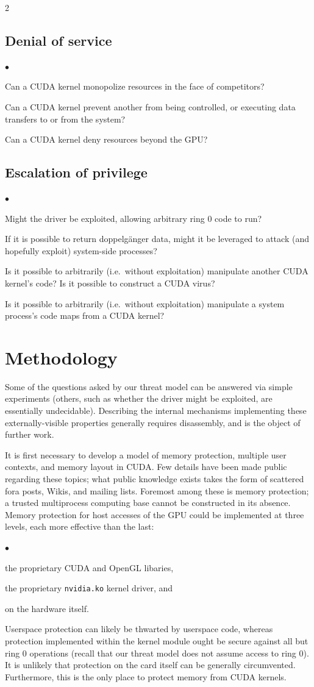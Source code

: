 \documentclass[letterpaper,10pt]{article}
\newcommand{\squishlist}{\begin{list}{$\bullet$}
  {\setlength{\itemsep}{0pt}
    \setlength{\parsep}{3pt}
    \setlength{\topsep}{3pt}
    \setlength{\partopsep}{0pt}
    \setlength{\leftmargin}{1.5em}
    \setlength{\labelwidth}{1em}
    \setlength{\labelsep}{0.5em}
  } }
\newcommand{\squishend}{\end{list}}
\begin{document}
\begin{multicols}{2}
\subsection{Denial of service}
\squishlist
\item Can a CUDA kernel monopolize resources in the face of competitors?
\item Can a CUDA kernel prevent another from being controlled, or executing
data transfers to or from the system?
\item Can a CUDA kernel deny resources beyond the GPU\@?
\squishend
\subsection{Escalation of privilege}
\squishlist
\item Might the driver be exploited, allowing arbitrary ring 0 code to run?
\item If it is possible to return doppelg\"anger data, might it be leveraged
to attack (and hopefully exploit) system-side processes?
\item Is it possible to arbitrarily (i.e.\ without exploitation) manipulate
another CUDA kernel's code? Is it possible to construct a CUDA virus?
\item Is it possible to arbitrarily (i.e.\ without exploitation) manipulate a
system process's code maps from a CUDA kernel?
\squishend

\section{Methodology}
Some of the questions asked by our threat model can be answered via simple
experiments (others, such as whether the driver might be exploited, are
essentially undecidable). Describing the internal mechanisms implementing these
externally-visible properties generally requires disassembly, and is the object
of further work.

It is first necessary to develop a model of memory protection, multiple user
contexts, and memory layout in CUDA. Few details have been made public
regarding these topics; what public knowledge exists takes the form of
scattered fora posts, Wikis\cite{nouveaucuda}, and mailing lists. Foremost among these is memory
protection; a trusted multiprocess computing base cannot be constructed in its
absence. Memory protection for host accesses of the GPU could be implemented at
three levels, each more effective than the last:
\squishlist
\item the proprietary CUDA and OpenGL libaries,
\item the proprietary \texttt{nvidia.ko} kernel driver, and
\item on the hardware itself.
\squishend
Userspace protection can likely be thwarted by userspace code, whereas
protection implemented within the kernel module ought be secure against
all but ring 0 operations (recall that our threat model does not assume access
to ring 0). It is unlikely that protection on the card itself can be generally
circumvented. Furthermore, this is the only place to protect memory from CUDA
kernels.


\end{multicols}
\end{document}

